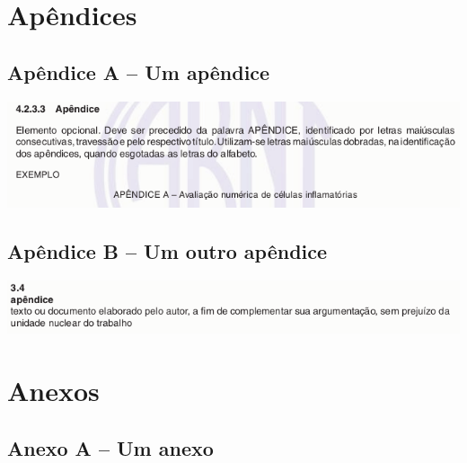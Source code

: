 \thispagestyle{empty}

\part*{Apêndices} %
\chapter*{Apêndice A -- Um apêndice}

\begin{center}
	\includegraphics[scale=.60]{./img/apendice-img1.png}
\end{center}

\chapter*{Apêndice B -- Um outro apêndice}

\begin{center}
	\includegraphics[scale=.60]{./img/apendice-img.png}
\end{center}


\thispagestyle{empty}
\part*{Anexos} %
\chapter*{Anexo A -- Um anexo}

